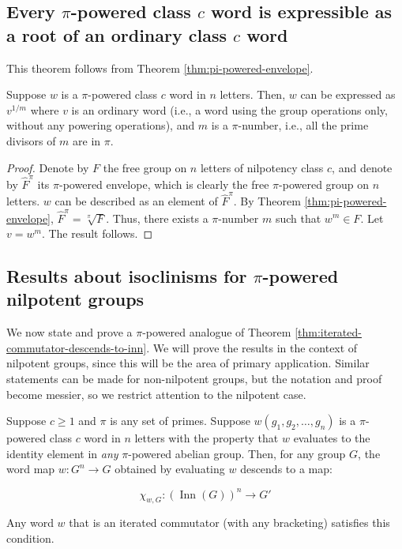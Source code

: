 \documentclass{ucetd}
\begin{document}
\subsection{Every $\pi$-powered class $c$ word is expressible as a root of an ordinary class $c$ word}

This theorem follows from Theorem \ref{thm:pi-powered-envelope}.

\begin{theorem}\label{thm:root-outside}
  Suppose $w$ is a $\pi$-powered class $c$ word in $n$ letters. Then,
  $w$ can be expressed as $v^{1/m}$ where $v$ is an ordinary word
  (i.e., a word using the group operations only, without any powering
  operations), and $m$ is a $\pi$-number, i.e., all the prime divisors
  of $m$ are in $\pi$.
\end{theorem}

\begin{proof}
  Denote by $F$ the free group on $n$ letters of nilpotency class $c$,
  and denote by $\hat{F}^\pi$ its $\pi$-powered envelope, which is
  clearly the free $\pi$-powered group on $n$ letters. $w$ can be
  described as an element of $\hat{F}^\pi$. By Theorem
  \ref{thm:pi-powered-envelope}, $\hat{F}^\pi = \sqrt[\pi]{F}$. Thus,
  there exists a $\pi$-number $m$ such that $w^m \in F$. Let $v =
  w^m$. The result follows.
\end{proof}

\subsection{Results about isoclinisms for $\pi$-powered nilpotent groups}\label{sec:pi-powered-isoclinism-results}

We now state and prove a $\pi$-powered analogue of Theorem
\ref{thm:iterated-commutator-descends-to-inn}. We will prove the
results in the context of nilpotent groups, since this will be the
area of primary application. Similar statements can be made for
non-nilpotent groups, but the notation and proof become messier, so we
restrict attention to the nilpotent case.

\begin{theorem}\label{thm:iterated-commutator-descends-to-inn-pi-powered}
  Suppose $c \ge 1$ and $\pi$ is any set of primes. Suppose
  $w(g_1,g_2,\dots,g_n)$ is a $\pi$-powered class $c$ word in $n$
  letters with the property that $w$ evaluates to the identity element
  in {\em any} $\pi$-powered abelian group. Then, for any group $G$,
  the word map $w:G^n \to G$ obtained by evaluating $w$ descends to a
  map:

  $$\chi_{w,G}: (\operatorname{Inn}(G))^n  \to G'$$

  Any word $w$ that is an iterated commutator (with any bracketing)
  satisfies this condition.
\end{theorem}
\end{document}

